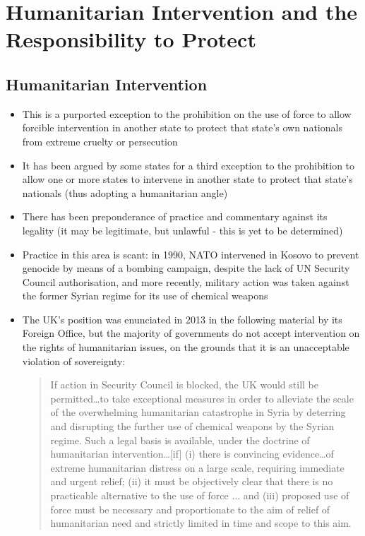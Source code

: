 \section{Humanitarian Intervention and the Responsibility to Protect}
\subsection{Humanitarian Intervention}
\begin{itemize}
    \item This is a purported exception to the prohibition on the use of force to allow forcible intervention in another state to protect that state's own nationals from extreme cruelty or persecution
    \item It has been argued by some states for a third exception to the prohibition to allow one or more states to intervene in another state to protect that state's nationals (thus adopting a humanitarian angle)
    \item There has been preponderance of practice and commentary against its legality (it may be legitimate, but unlawful - this is yet to be determined)
    \item Practice in this area is scant: in 1990, NATO intervened in Kosovo to prevent genocide by means of a bombing campaign, despite the lack of UN Security Council authorisation, and more recently, military action was taken against the former Syrian regime for its use of chemical weapons
    \item The UK's position was enunciated in 2013 in the following material by its Foreign Office, but the majority of governments do not accept intervention on the rights of humanitarian issues, on the grounds that it is an unacceptable violation of sovereignty:
    \begin{quote}
        If action in Security Council is blocked, the UK would still be permitted…to take exceptional measures in order to alleviate the scale of the overwhelming humanitarian catastrophe in Syria by deterring and disrupting the further use of chemical weapons by the Syrian regime. Such a legal basis is available, under the doctrine of humanitarian intervention…[if] (i) there is convincing evidence…of extreme humanitarian distress on a large scale, requiring immediate and urgent relief; (ii) it must be objectively clear that there is no practicable alternative to the use of force ... and (iii) proposed use of force must be necessary and proportionate to the aim of relief of humanitarian need and strictly limited in time and scope to this aim.
    \end{quote}
\end{itemize}

